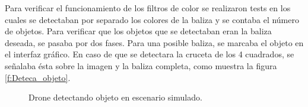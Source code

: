 

\hspace{1cm} Para verificar el funcionamiento de los filtros de color se realizaron tests en los cuales se detectaban por separado los colores de la baliza y se contaba el n\'umero de objetos. Para verificar que los objetos que se detectaban eran la baliza deseada, se pasaba por dos fases. Para una posible baliza, se marcaba el objeto en el interfaz gr\'afico. En caso de que se detectara la cruceta de los 4 cuadrados, se señalaba \'esta sobre la imagen y la baliza completa, como muestra la figura \ref{f:Deteca_objeto}.

\begin{figure}[H]
 \centering
 \caption{Drone detectando objeto en escenario simulado.}
 \label{f:Drone detecta objeto. }
\end{figure} 



